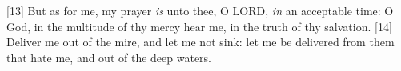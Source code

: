 [13] \textcolor[cmyk]{0.99998,1,0,0}{But as for me, my prayer \emph{is} unto thee, O LORD, \emph{in} an acceptable time: O God, in the multitude of thy mercy hear me, in the truth of thy salvation.} %
[14] \textcolor[cmyk]{0.99998,1,0,0}{Deliver me out of the mire, and let me not sink: let me be delivered from them that hate me, and out of the deep waters.} %
